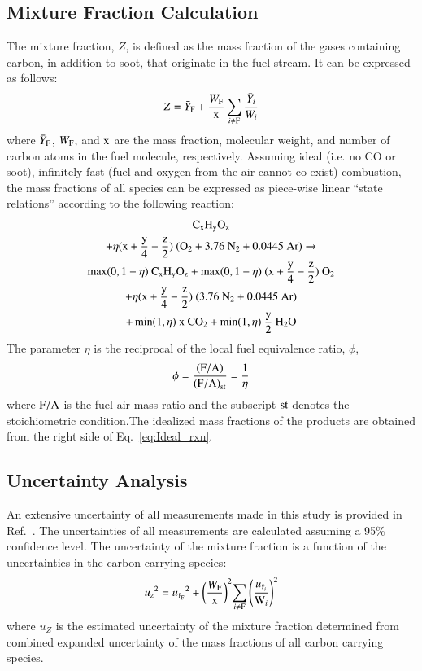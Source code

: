 \documentclass[preprint,review,12pt]{elsarticle}
\begin{document}
\subsection{Mixture Fraction Calculation}
\label{ssec:Mixture_Fraction_Calculation}
The mixture fraction, $Z$, is defined as the mass fraction of the gases containing carbon, in addition to soot, that originate in the fuel stream. It can be expressed as follows:
\begin{equation}\label{eq:Mixture_Fraction}
Z = \bar{Y}_{\rm F} + \frac{W_{\rm F}}{\rm x} \sum_{i\ne{\rm F}} \frac{\bar{Y}_i}{W_{i}}
\end{equation}
where $\bar{Y}_{\rm F}$, ${W_{\rm F}}$, and $\rm x$ are the mass fraction, molecular weight, and number of carbon atoms in the fuel molecule, respectively. Assuming ideal (i.e. no CO or soot), infinitely-fast (fuel and oxygen from the air cannot co-exist) combustion, the mass fractions of all species can be expressed as piece-wise linear ``state relations'' according to the following reaction:
\begin{multline}\label{eq:Ideal_rxn}
{\rm C}_{\rm x}{\rm H}_{\rm y}{\rm O}_{\rm z}\\ +\eta(\rm x+\frac{\rm y}{4}-\frac{\rm z}{2})~({\rm O}_{2}+3.76~{\rm N}_{2}+0.0445~{\rm Ar}) \rightarrow \\ \max(0,1-\eta)~{\rm C}_{\rm x}{\rm H}_{\rm y}{\rm O}_{\rm z}+\max(0,1- \eta)~(\rm x+\frac{\rm y}{4}-\frac{\rm z}{2})~{\rm O}_{2} \\ +\eta(\rm x+\frac{\rm y}{4}-\frac{\rm z}{2})~(3.76~{\rm N}_{2}+0.0445~{\rm Ar})\\+ \min(1,\eta)~\rm x~{\rm CO}_{2}+\min(1,\eta)~\frac{\rm y}{2}~{\rm H}_{2}{\rm O}
\end{multline}
The parameter $\eta$ is the reciprocal of the local fuel equivalence ratio, $\phi$,
\begin{equation}\label{eq:Eta}
\phi=\frac{\rm (F/A)}{{\rm (F/A)}_{\rm st}}=\frac{1}{\eta}
\end{equation}
where $\rm F/A$ is the fuel-air mass ratio and the subscript $\rm st$ denotes the stoichiometric condition.The idealized mass fractions of the products are obtained from the right side of Eq.~\ref{eq:Ideal_rxn}.
\subsection{Uncertainty Analysis}
\label{ssec:Uncertainty Analysis}
An extensive uncertainty of all measurements made in this study is provided in Ref.~\cite{Falkenstein2019}. The uncertainties of all measurements are calculated assuming a 95\% confidence level. The uncertainty of the mixture fraction is a function of the uncertainties in the carbon carrying species:
\begin{equation}
\label{eq:mixture_frac_uncertainty}
{u_{\scriptscriptstyle Z}}^2={{u_{\scriptscriptstyle \bar{Y}_{\rm F}}}^2+{\left(\frac{W_{\rm F}}{\rm x}\right)}^2{\sum_{i\ne {\rm F}}{\left(\frac{u_{\scriptscriptstyle \bar{Y}_{i}}}{\textrm{W}_{i}} \right)}^2}}
\end{equation}
where $u_{\scriptscriptstyle Z}$ is the estimated uncertainty of the mixture fraction determined from combined expanded uncertainty of the mass fractions of all carbon carrying species. 
\end{document}
